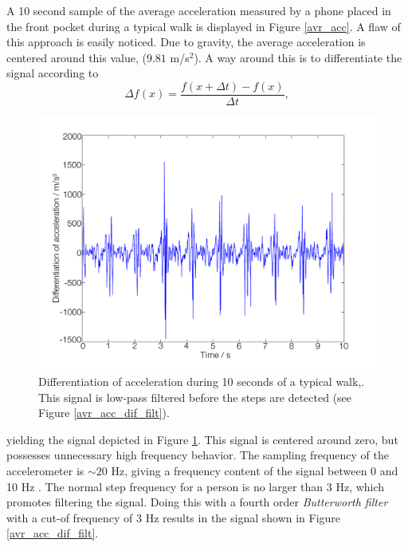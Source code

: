 \documentclass{LTHthesis}
\begin{document}
A 10 second sample of the average acceleration measured by a phone placed in the front pocket during a typical walk is displayed in Figure \ref{avr_acc}. A flaw of this approach is easily noticed. Due to gravity, the average acceleration is centered around this value, ($9.81$ m/s$^2$). A way around this is to differentiate the signal according to 
%
\begin{equation}
\Delta f(x) = \frac{f(x+\Delta t) - f(x) }{\Delta t},
\end{equation} 
%
\begin{figure}[!hbt]

\includegraphics[width=1\textwidth ]{images/kinematic/avr_acc_dif}
\caption{Differentiation of acceleration during 10 seconds of a typical walk,. This signal is low-pass filtered before the steps are detected (see Figure \ref{avr_acc_dif_filt}).}\label{avr_acc_dif}
\end{figure}
%
yielding the signal depicted in Figure \ref{avr_acc_dif}. This signal is centered around zero, but possesses unnecessary high frequency behavior. The sampling frequency of the accelerometer is $\sim 20$ Hz, giving a frequency content of the signal between 0 and 10 Hz \cite{pro07}. The normal step frequency for a person is no larger than 3 Hz, which promotes filtering the signal. Doing this with a fourth order \emph{Butterworth filter} with a cut-of frequency of 3 Hz results in the signal shown in Figure \ref{avr_acc_dif_filt}.
%
\end{document}
